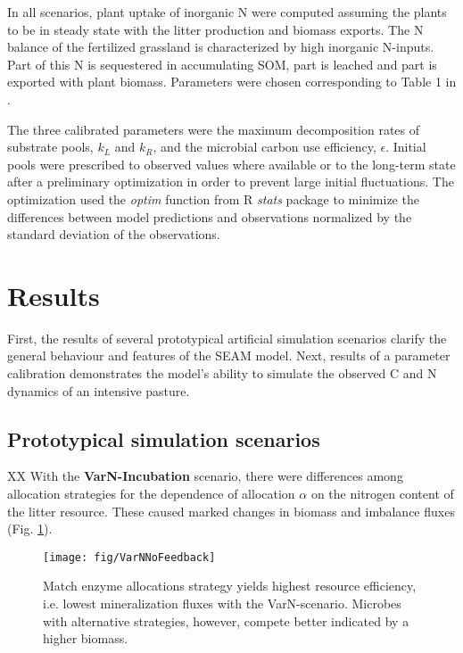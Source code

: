 In all scenarios, plant uptake of inorganic N were
computed assuming the plants to be in steady state with the litter
production and biomass exports. The N balance of the fertilized grassland is
 characterized by high inorganic N-inputs. Part of this N is sequestered in accumulating SOM, part
is leached and part is exported with plant biomass. Parameters were chosen
corresponding to Table 1 in \citep{Perveen14}. 

The three calibrated parameters were the maximum decomposition rates of
substrate pools, $k_L$ and $k_R$, and the microbial carbon use efficiency,
$\epsilon$. Initial pools were prescribed to observed values where available or
to the long-term state after a preliminary optimization in order to prevent
large initial fluctuations. The optimization used the \textit{optim}
function from R \textit{stats} package \citep{R07} to minimize the differences
between model predictions and observations normalized by the standard deviation
of the observations.
 
\section{Results}

First, the results of several prototypical artificial simulation scenarios
clarify the general behaviour and features of the SEAM model. Next, results of a
parameter calibration demonstrates the model's ability to
simulate the observed C and N dynamics of an intensive pasture.

\subsection{Prototypical simulation scenarios
\label{sec:ResultsProto}}

XX
With the \textbf{VarN-Incubation} scenario, there were differences among
allocation strategies for the dependence of allocation $\alpha$ on the nitrogen
content of the litter resource. These caused marked changes in
biomass and imbalance fluxes (Fig.
\ref{fig:VarNNoFeedback}).
 
\begin{figure}[t]
\vspace*{2mm}
\begin{center}
\texttt{[image: fig/VarNNoFeedback]}
\end{center}
\caption{Match enzyme allocations strategy yields highest resource
efficiency, i.e. lowest mineralization fluxes with the VarN-scenario. Microbes
with alternative strategies, however, compete better indicated by a higher biomass.
\label{fig:VarNNoFeedback}}
\end{figure}

